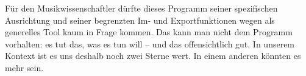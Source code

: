 Für den Musikwissenschaftler dürfte dieses Programm seiner spezifischen
Ausrichtung und seiner begrenzten Im- und Exportfunktionen wegen als generelles
Tool kaum in Frage kommen. Das kann man nicht dem Programm vorhalten: es
tut das, was es tun will -- und das offensichtlich gut. In unserem Kontext ist
es uns deshalb noch zwei Sterne wert. In einem anderen könnten es mehr sein.

% 
